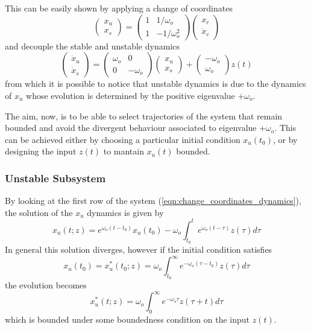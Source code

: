 \documentclass[11pt]{article}
\begin{document}
This can be easily shown by applying a change of coordinates
\begin{equation}
\label{eqn:change_coordinates}
\begin{pmatrix}
x_u\\
x_s
\end{pmatrix}=\begin{pmatrix}
1 & 1/\omega_o\\
1 & -1/\omega_o^2
\end{pmatrix}\begin{pmatrix}
x_c \\
\dot{x}_c
\end{pmatrix}
\end{equation}
and decouple the stable and unstable dynamics
\begin{equation}
\label{eqn:change_coordinates_dynamics}
\begin{pmatrix}
\dot{x}_u\\
\dot{x}_s
\end{pmatrix}=\begin{pmatrix}
\omega_o & 0\\
0 & -\omega_o
\end{pmatrix}\begin{pmatrix}
x_u \\
x_s
\end{pmatrix}+\begin{pmatrix}
-\omega_o \\
\omega_o
\end{pmatrix}z(t)
\end{equation}
from which it is possible to notice that unstable dynamics is due to the dynamics of $x_u$ whose evolution is determined by the positive eigenvalue $+\omega_o$.

The aim, now, is to be able to select trajectories of the system that remain bounded and avoid the divergent behaviour associated to eigenvalue $+\omega_o$. This can be achieved either by choosing a particular initial condition $x_u(t_0)$, or by designing the input $z(t)$ to mantain $x_u(t)$ bounded.

\subsubsection{Unstable Subsystem}

By looking at the first row of the system (\ref{eqn:change_coordinates_dynamics}), the solution of the $x_u$ dynamics is given by
\begin{equation}
\label{eqn:x_u_solution}
x_u(t;z) = e^{\omega_o(t-t_0)}x_u(t_0)-\omega_o\int_{t_0}^t{e^{\omega_o(t-\tau)}z(\tau)d\tau}
\end{equation}
In general this solution diverges, however if the initial condition satisfies
\begin{equation}
\label{eqn:x_u_general_init}
x_u(t_0) = x_u^*(t_0;z) = \omega_o\int_{t_0}^\infty{e^{-\omega_o(\tau-t_0)}z(\tau)d\tau}
\end{equation}
the evolution becomes
\begin{equation}
\label{eqn:x_u_bounded_ev}
x_u^*(t;z) = \omega_o\int_{0}^\infty{e^{-\omega_o\tau}z(\tau+t)d\tau}
\end{equation}
which is bounded under some boundedness condition on the input $z(t)$.
\end{document}
